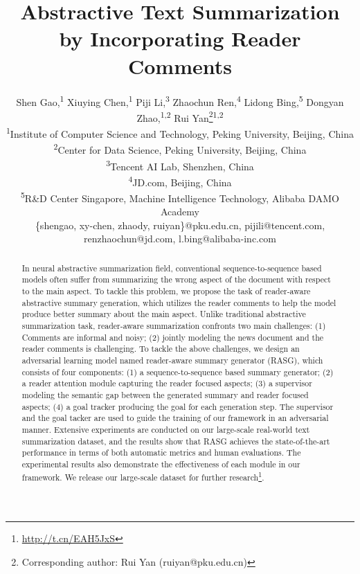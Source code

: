 \documentclass[letterpaper]{article} \usepackage{aaai19}  \usepackage{times}  \usepackage{helvet}  \usepackage{courier}
\begin{document}
\title{Abstractive Text Summarization by Incorporating Reader Comments}
\author{Shen Gao,\textsuperscript{1}
    	Xiuying Chen,\textsuperscript{1}
    	Piji Li,\textsuperscript{3}
    	Zhaochun Ren,\textsuperscript{4}
    	Lidong Bing,\textsuperscript{5}
    	Dongyan Zhao,\textsuperscript{1,2}
    	Rui Yan\thanks{Corresponding author: Rui Yan (ruiyan@pku.edu.cn)}\textsuperscript{1,2}\\
    	\textsuperscript{1}{Institute of Computer Science and Technology, Peking University, Beijing, China} \\
    	\textsuperscript{2}{Center for Data Science, Peking University, Beijing, China}\\
    	\textsuperscript{3}{Tencent AI Lab, Shenzhen, China} \\
    	\textsuperscript{4}{JD.com, Beijing, China} \\
    	\textsuperscript{5}{R\&D Center Singapore, Machine Intelligence Technology, Alibaba DAMO Academy}\\
    	\{shengao, xy-chen, zhaody, ruiyan\}@pku.edu.cn,
    	pijili@tencent.com, 
    	renzhaochun@jd.com,
    	l.bing@alibaba-inc.com}
            
    \maketitle
    \begin{abstract}
    In neural abstractive summarization field, conventional sequence-to-sequence based models often suffer from summarizing the wrong aspect of the document with respect to the main aspect.
    To tackle this problem, we propose the task of reader-aware abstractive summary generation, which utilizes the reader comments to help the model produce better summary about the main aspect. 
    Unlike traditional abstractive summarization task, reader-aware summarization confronts two main challenges: (1) Comments are informal and noisy;
(2) jointly modeling the news document and the reader comments is challenging.
    To tackle the above challenges, we design an adversarial learning model named reader-aware summary generator (RASG), which consists of four components: (1) a sequence-to-sequence based summary generator; (2) a reader attention module capturing the reader focused aspects; (3) a supervisor modeling the semantic gap between the generated summary and reader focused aspects; (4) a goal tracker producing the goal for each generation step.
    The supervisor and the goal tacker are used to guide the training of our framework in an adversarial manner.
Extensive experiments are conducted on our large-scale real-world text summarization dataset, and the results show that RASG achieves the state-of-the-art performance in terms of both automatic metrics and human evaluations. The experimental results also demonstrate the effectiveness of each module in our framework.
    We release our large-scale dataset for further research\footnote{\url{http://t.cn/EAH5JxS}}.
    \end{abstract}
\end{document}
